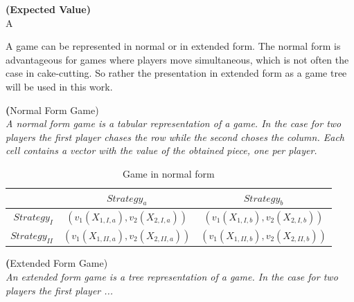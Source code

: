\begin{defi}{\textbf{(Expected Value)}}\\
A 
\end{defi}
A game can be represented in normal or in extended form. The normal form is advantageous for games where players move simultaneous, which is not often the case in cake-cutting. So rather the presentation in extended form as a game tree will be used in this work.
\begin{defi}\textbf({Normal Form Game)}\\
\emph{A \emph{normal form game} is a tabular representation of a game. In the case for two players the first player chases the row while the second choses the column. Each cell contains a vector with the value of the obtained piece, one per player.}
\end{defi}
\begin{table}[htb]
\centering
 \renewcommand{\arraystretch}{1.2} 
\begin{tabular}{c|c|c|}
\cline{2-3}
&\multicolumn{1}{|c|}{$Strategy_a$}& {$Strategy_b$}\\
\hline
\multicolumn{1}{|r|}{$Strategy_I$}&$\left(v_1(X_{1,I,a}), v_2(X_{2,I,a}) \right)$&$\left(v_1(X_{1,I,b}), v_2(X_{2,I,b}) \right)$\\
\hline
\multicolumn{1}{|r|}{$Strategy_{II}$}&$\left(v_1(X_{1,II,a}), v_2(X_{2,II,a}) \right)$&$\left(v_1(X_{1,II,b}), v_2(X_{2,II,b}) \right)$\\
\hline
\end{tabular}
\caption{Game in normal form}\label{Table0}
\end{table}
\begin{defi}\textbf({Extended Form Game)}\\
\emph{An \emph{extended form game} is a tree representation of a game. In the case for two players the first player ...}
\end{defi}
